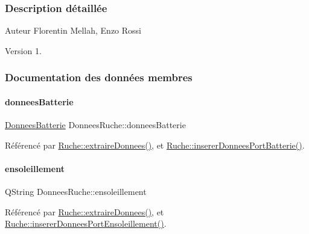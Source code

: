 \subsubsection{Description détaillée}
\begin{DoxyAuthor}{Auteur}
Florentin Mellah, Enzo Rossi
\end{DoxyAuthor}
\begin{DoxyVersion}{Version}
1. 
\end{DoxyVersion}


\subsubsection{Documentation des données membres}
\mbox{\label{struct_donnees_ruche_a67dc57b9568529e595a5a31e93eef703}} 
\paragraph{\texorpdfstring{donnees\+Batterie}{donneesBatterie}}
{\footnotesize\ttfamily \hyperlink{struct_donnees_batterie}{Donnees\+Batterie} Donnees\+Ruche\+::donnees\+Batterie}



Référencé par \hyperlink{class_ruche_a21c0dafeaec03d451590037343e6a3ca}{Ruche\+::extraire\+Donnees()}, et \hyperlink{class_ruche_a509367d6b2bcb7e6431fc1cc5ff606b5}{Ruche\+::inserer\+Donnees\+Port\+Batterie()}.

\mbox{\label{struct_donnees_ruche_adfa6aee15b2a96b968e558ac14e0f2de}} 
\paragraph{\texorpdfstring{ensoleillement}{ensoleillement}}
{\footnotesize\ttfamily Q\+String Donnees\+Ruche\+::ensoleillement}



Référencé par \hyperlink{class_ruche_a21c0dafeaec03d451590037343e6a3ca}{Ruche\+::extraire\+Donnees()}, et \hyperlink{class_ruche_ad21de5f7d48195be0658f52c55f34183}{Ruche\+::inserer\+Donnees\+Port\+Ensoleillement()}.

